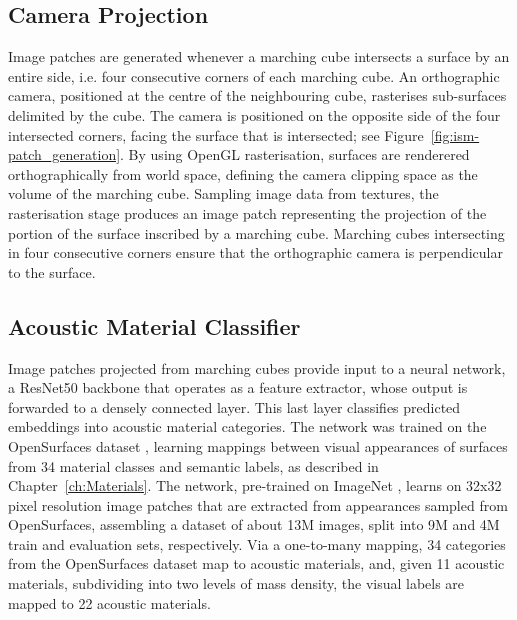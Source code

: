\subsection{Camera Projection}
Image patches are generated whenever a marching cube intersects a surface by an entire side, i.e. four consecutive corners of each marching cube. An orthographic camera, positioned at the centre of the neighbouring cube, rasterises sub-surfaces delimited by the cube. The camera is positioned on the opposite side of the four intersected corners, facing the surface that is intersected; see Figure~\ref{fig:ism-patch_generation}. 
By using OpenGL rasterisation, surfaces are renderered orthographically from world space, defining the camera clipping space as the volume of the marching cube. Sampling image data from textures, the rasterisation stage produces an image patch representing the projection of the portion of the surface inscribed by a marching cube. Marching cubes intersecting in four consecutive corners ensure that the orthographic camera is perpendicular to the surface. \par

\subsection{Acoustic Material Classifier}
Image patches projected from marching cubes provide input to a neural network, a ResNet50 \citep{he2016deep} backbone that operates as a feature extractor, whose output is forwarded to a densely connected layer. This last layer classifies predicted embeddings into acoustic material categories. The network was trained on the OpenSurfaces dataset \citep{bell2013opensurfaces}, learning mappings between visual appearances of surfaces from 34 material classes and semantic labels, as described in Chapter~\ref{ch:Materials}. The network, pre-trained on ImageNet \citep{deng2009imagenet}, learns on 32x32 pixel resolution image patches that are extracted from appearances sampled from OpenSurfaces, assembling a dataset of about 13M images, split into 9M and 4M train and evaluation sets, respectively. Via a one-to-many mapping, 34 categories from the OpenSurfaces dataset map to acoustic materials, and, given 11 acoustic materials, subdividing into two levels of mass density, the visual labels are mapped to 22 acoustic materials. \par

